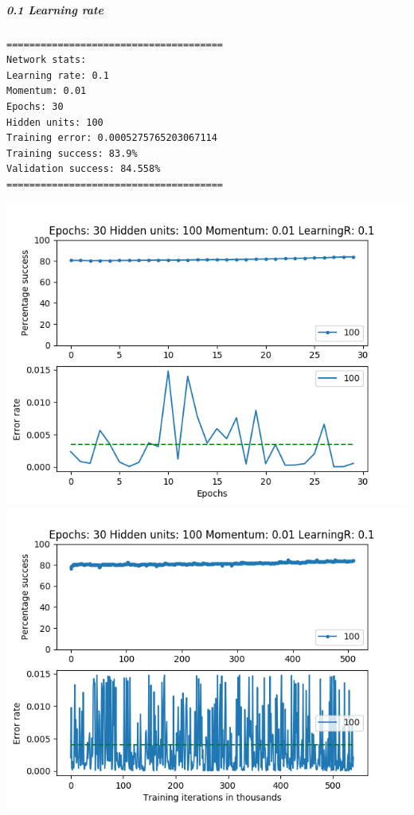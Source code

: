 \documentclass[11pt]{article}
\makeatletter
\def\maxwidth{\ifdim\Gin@nat@width>\linewidth\linewidth
    \else\Gin@nat@width\fi}
\let\Oldincludegraphics\includegraphics
\renewcommand{\includegraphics}[1]{\Oldincludegraphics[width=.8\maxwidth]{#1}}
\makeatother
\begin{document}
\hypertarget{learning-rate-1}{%
\subparagraph{0.1 Learning rate}\label{learning-rate-1}}

\begin{verbatim}
======================================
Network stats: 
Learning rate: 0.1
Momentum: 0.01
Epochs: 30
Hidden units: 100
Training error: 0.0005275765203067114
Training success: 83.9%
Validation success: 84.558%
======================================
\end{verbatim}

\includegraphics{Experiment2/E2_NN_Epoch_Momentum_0.01_30Epochs_100_LR_0.1_Hiddenunits.png}
\includegraphics{Experiment2/E2_NN_Training_Momentum_0.01_30Epochs_100_LR_0.1_Hiddenunits.png}
\end{document}
